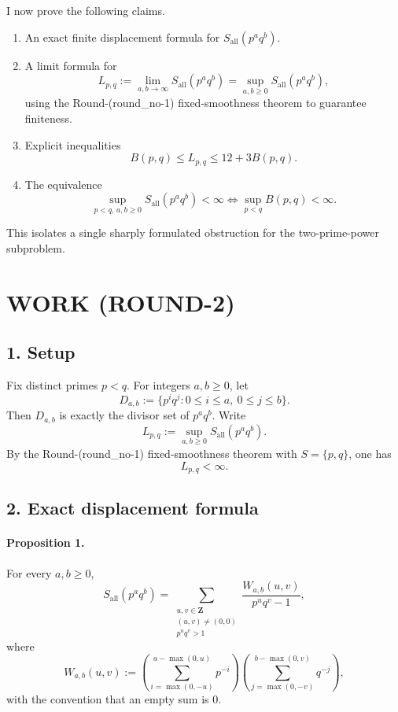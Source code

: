 I now prove the following claims.

\begin{enumerate}
\item An exact finite displacement formula for \(S_{\mathrm{all}}(p^a q^b)\).
\item A limit formula for
\[
L_{p,q}:=\lim_{a,b\to\infty}S_{\mathrm{all}}(p^a q^b)=\sup_{a,b\ge 0}S_{\mathrm{all}}(p^a q^b),
\]
using the Round-(round\_no-1) fixed-smoothness theorem to guarantee finiteness.
\item Explicit inequalities
\[
B(p,q)\le L_{p,q}\le 12+3B(p,q).
\]
\item The equivalence
\[
\sup_{p<q,\,a,b\ge 0}S_{\mathrm{all}}(p^a q^b)<\infty
\iff
\sup_{p<q}B(p,q)<\infty.
\]
\end{enumerate}

This isolates a single sharply formulated obstruction for the two-prime-power subproblem.

\section{WORK (ROUND-2)}

\subsection*{1. Setup}

Fix distinct primes \(p<q\). For integers \(a,b\ge 0\), let
\[
D_{a,b}:=\{p^i q^j:0\le i\le a,\ 0\le j\le b\}.
\]
Then \(D_{a,b}\) is exactly the divisor set of \(p^a q^b\). Write
\[
L_{p,q}:=\sup_{a,b\ge 0}S_{\mathrm{all}}(p^a q^b).
\]
By the Round-(round\_no-1) fixed-smoothness theorem with \(S=\{p,q\}\), one has
\[
L_{p,q}<\infty.
\]

\subsection*{2. Exact displacement formula}

\paragraph{Proposition 1.}
For every \(a,b\ge 0\),
\[
S_{\mathrm{all}}(p^a q^b)
=
\sum_{\substack{u,v\in\mathbf Z\\(u,v)\neq(0,0)\\p^u q^v>1}}
\frac{W_{a,b}(u,v)}{p^u q^v-1},
\]
where
\[
W_{a,b}(u,v)
:=
\left(\sum_{i=\max(0,-u)}^{a-\max(0,u)}p^{-i}\right)
\left(\sum_{j=\max(0,-v)}^{b-\max(0,v)}q^{-j}\right),
\]
with the convention that an empty sum is \(0\).

